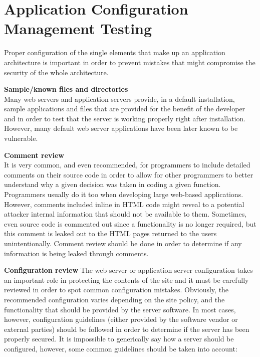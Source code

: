 \section{Application Configuration Management Testing}
	Proper configuration of the single elements that make up an application architecture is important 
	in order to prevent mistakes that might compromise the security of the whole architecture.

	{\bf Sample/known files and directories}\\
	Many web servers and application servers provide, in a default installation, sample applications 
	and files that are provided for the benefit of the developer and in order to test that the server 
	is working properly right after installation. However, many default web server applications have 
	been later known to be vulnerable.

	{\bf Comment review} \\
	It is very common, and even recommended, for programmers to include detailed comments on their 
	source code in order to allow for other programmers to better understand why a given decision 
	was taken in coding a given function. Programmers usually do it too when developing large 
	web-based applications. However, comments included inline in HTML code might reveal to a 
	potential attacker internal information that should not be available to them. Sometimes, even
	source code is commented out since a functionality is no longer required, but this comment is 
	leaked out to the HTML pages returned to the users unintentionally. Comment review should be 
	done in order to determine if any information is being leaked through comments.

	{\bf Configuration review}
	The web server or application server configuration takes an important role in protecting the 
	contents of the site and it must be carefully reviewed in order to spot common configuration 
	mistakes. Obviously, the recommended configuration varies depending on the site policy, 
	and the functionality that should be provided by the server software. In most cases, however,
	configuration guidelines (either provided by the software vendor or external parties) should 
	be followed in order to determine if the server has been properly secured. It is impossible 
	to generically say how a server should be configured, however, some common guidelines should 
	be taken into account:

